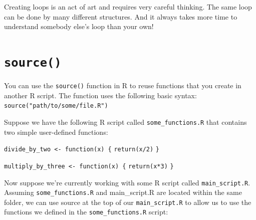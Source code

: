 \documentclass[
]{book}
\newenvironment{Shaded}{\begin{snugshade}}{\end{snugshade}}
\newcommand{\AttributeTok}[1]{\textcolor[rgb]{0.77,0.63,0.00}{#1}}
\newcommand{\DecValTok}[1]{\textcolor[rgb]{0.00,0.00,0.81}{#1}}
\newcommand{\FunctionTok}[1]{\textcolor[rgb]{0.00,0.00,0.00}{#1}}
\newcommand{\NormalTok}[1]{#1}
\newcommand{\OtherTok}[1]{\textcolor[rgb]{0.56,0.35,0.01}{#1}}
\newcommand{\SpecialCharTok}[1]{\textcolor[rgb]{0.00,0.00,0.00}{#1}}
\newcommand{\StringTok}[1]{\textcolor[rgb]{0.31,0.60,0.02}{#1}}
\begin{document}
Creating loops is an act of art and requires very careful thinking. The same loop can be done by many different structures. And it always takes more time to understand somebody else's loop than your own!

\hypertarget{source}{%
\section{\texorpdfstring{\texttt{source()}}{source()}}\label{source}}

You can use the \texttt{source()} function in R to reuse functions that you create in another R script. The function uses the following basic syntax: \texttt{source("path/to/some/file.R")}

Suppose we have the following R script called \texttt{some\_functions.R} that contains two simple user-defined functions:

\texttt{divide\_by\_two\ \textless{}-\ function(x)\ \{}
\texttt{return(x/2)}
\texttt{\}}

\texttt{multiply\_by\_three\ \textless{}-\ function(x)\ \{}
\texttt{return(x*3)}
\texttt{\}}

Now suppose we're currently working with some R script called \texttt{main\_script.R}. Assuming \texttt{some\_functions.R} and main\_script.R are located within the same folder, we can use source at the top of our \texttt{main\_script.R} to allow us to use the functions we defined in the \texttt{some\_functions.R} script:

\begin{Shaded}
\end{Shaded}
\end{document}
